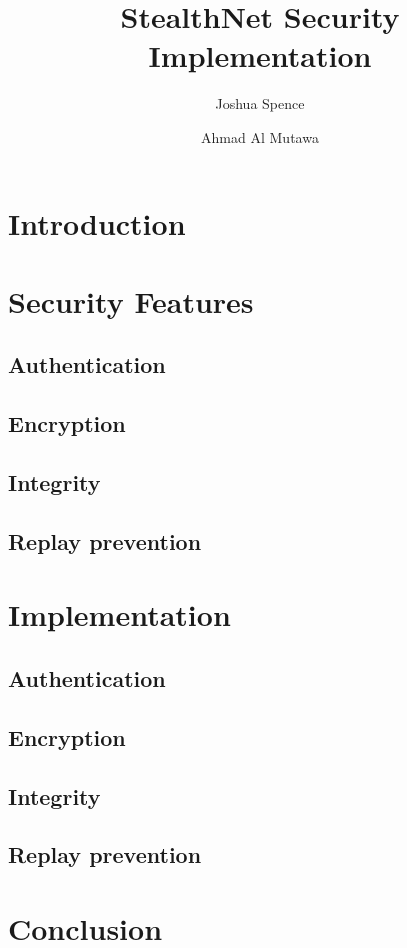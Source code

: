 \documentclass[a4paper,11pt]{article}
\title{StealthNet Security Implementation}
\author{Joshua Spence \and Ahmad Al Mutawa}
\date{}
\begin{document}
\maketitle

\section{Introduction}

\section{Security Features}
\subsection{Authentication}
\subsection{Encryption}
\subsection{Integrity}
\subsection{Replay prevention}

\section{Implementation}
\subsection{Authentication}
\subsection{Encryption}
\subsection{Integrity}
\subsection{Replay prevention}

\section{Conclusion}
\end{document}
